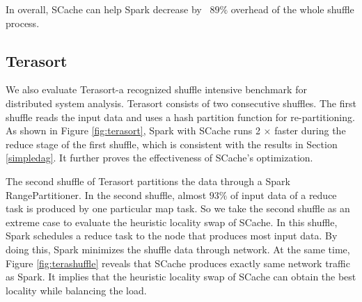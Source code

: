 In overall, SCache can help Spark decrease by ~$89\%$ overhead of the whole shuffle process. 

\subsection{Terasort}
We also evaluate Terasort-a recognized shuffle intensive benchmark for distributed system analysis. 
Terasort consists of two consecutive shuffles. 
The first shuffle reads the input data and uses a hash partition function for re-partitioning. 
As shown in Figure \ref{fig:terasort}, Spark with SCache runs 2 $\times$ faster during the reduce stage of the first shuffle, which is consistent with the results in Section \ref{simpledag}. 
It further proves the effectiveness of SCache's optimization.

The second shuffle of Terasort partitions the data through a Spark RangePartitioner. 
In the second shuffle, almost $93\%$ of input data of a reduce task is produced by one particular map task. 
So we take the second shuffle as an extreme case to evaluate the heuristic locality swap of SCache.
In this shuffle, Spark schedules a reduce task to the node that produces most input data. 
By doing this, Spark minimizes the shuffle data through network. 
At the same time, Figure \ref{fig:terashuffle} reveals that SCache produces exactly same network traffic as Spark. 
It implies that the heuristic locality swap of SCache can obtain the best locality while balancing the load. 
